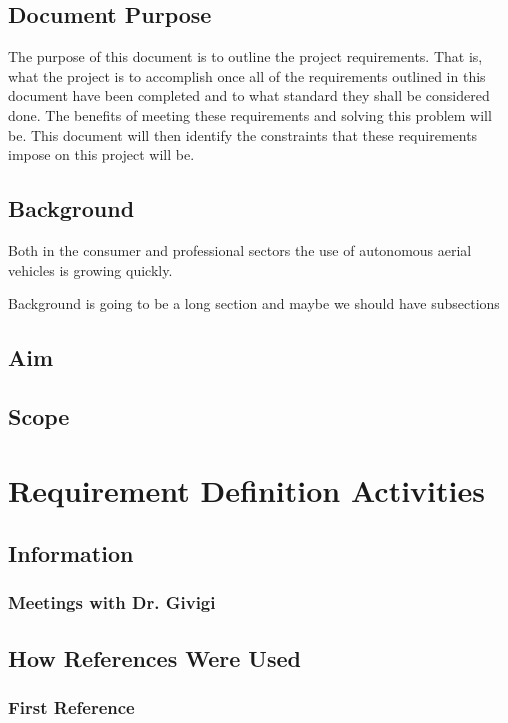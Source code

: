 \documentclass[]{report}
\begin{document}
\section{Document Purpose}

The purpose of this document is to outline the project requirements. That is, what the project is to accomplish once all of the requirements outlined in this document have been completed and to what standard they shall be considered done. The benefits of meeting these requirements and solving this problem will be. This document will then identify the constraints that these requirements impose on this project will be.

\section{Background}

Both in the consumer and professional sectors the use of autonomous aerial vehicles is growing quickly. 

Background is going to be a long section and maybe we should have subsections

\section{Aim}

\section{Scope}

\chapter{Requirement Definition Activities}

\section{Information}

\subsection{Meetings with Dr. Givigi}

\section{How References Were Used}

\subsection{First Reference}
\end{document}
